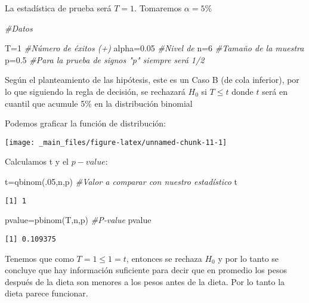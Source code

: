 \documentclass[
  a4paper,
  oneside,
  openany]{book}
\newenvironment{Shaded}{\begin{snugshade}}{\end{snugshade}}
\newcommand{\CommentTok}[1]{\textcolor[rgb]{0.56,0.35,0.01}{\textit{#1}}}
\newcommand{\DecValTok}[1]{\textcolor[rgb]{0.00,0.00,0.81}{#1}}
\newcommand{\FloatTok}[1]{\textcolor[rgb]{0.00,0.00,0.81}{#1}}
\newcommand{\FunctionTok}[1]{\textcolor[rgb]{0.00,0.00,0.00}{#1}}
\newcommand{\NormalTok}[1]{#1}
\newcommand{\OtherTok}[1]{\textcolor[rgb]{0.56,0.35,0.01}{#1}}
\begin{document}
La estadística de prueba será \(T=1\). Tomaremos \(\alpha=5\%\)

\begin{Shaded}
\begin{Highlighting}[]
\CommentTok{\#Datos}

\NormalTok{T}\OtherTok{=}\DecValTok{1}              \CommentTok{\#Número de éxitos (+)}
\NormalTok{alpha}\OtherTok{=}\FloatTok{0.05}       \CommentTok{\#Nivel de }
\NormalTok{n}\OtherTok{=}\DecValTok{6}              \CommentTok{\#Tamaño de la muestra }
\NormalTok{p}\OtherTok{=}\FloatTok{0.5}            \CommentTok{\#Para la prueba de signos "p" siempre será 1/2}
\end{Highlighting}
\end{Shaded}

Según el planteamiento de las hipótesis, este es un Caso B (de cola inferior), por lo que siguiendo la regla de decisión, se rechazará \(H_0\) si \(T\leq t\) donde \(t\) será en cuantil que acumule 5\% en la distribución binomial

Podemos graficar la función de distribución:

\begin{center}\texttt{[image: \_main\_files/figure-latex/unnamed-chunk-11-1]} \end{center}

Calculamos t y el \(p-value\):

\begin{Shaded}
\begin{Highlighting}[]
\NormalTok{t}\OtherTok{=}\FunctionTok{qbinom}\NormalTok{(.}\DecValTok{05}\NormalTok{,n,p)         }\CommentTok{\#Valor a comparar con nuestro estadístico}
\NormalTok{t}
\end{Highlighting}
\end{Shaded}

\begin{verbatim}
[1] 1
\end{verbatim}

\begin{Shaded}
\begin{Highlighting}[]
\NormalTok{pvalue}\OtherTok{=}\FunctionTok{pbinom}\NormalTok{(T,n,p)       }\CommentTok{\#P{-}value}
\NormalTok{pvalue}
\end{Highlighting}
\end{Shaded}

\begin{verbatim}
[1] 0.109375
\end{verbatim}

Tenemos que como \(T=1\leq 1 =t\), entonces se rechaza \(H_0\) y por lo tanto se concluye que hay información suficiente para decir que en promedio los pesos después de la dieta son menores a los pesos antes de la dieta. Por lo tanto la dieta parece funcionar.
\end{document}

